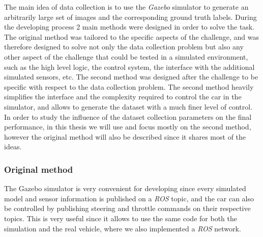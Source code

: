 \documentclass[a4paper,12pt,sort&compress]{article}
\begin{document}
The main idea of data collection is to use the \textit{Gazebo} simulator to generate an arbitrarily
large set of images and the corresponding ground truth labels. During the developing process 2 main
methods were designed in order to solve the task. The original method was tailored to the specific
aspects of the challenge, and was therefore designed to solve not only the data collection problem
but also any other aspect of the challenge that could be tested in a simulated environment, such as
the high level logic, the control system, the interface with the additional simulated sensors, etc.
The second method was designed after the challenge to be specific with respect to the data
collection problem. The second method heavily simplifies the interface and the complexity required
to control the car in the simulator, and allows to generate the dataset with a much finer level of
control. In order to study the influence of the dataset collection parameters on the final
performance, in this thesis we will use and focus mostly on the second method, however the original
method will also be described since it shares most of the ideas.

\subsubsection*{Original method}
The Gazebo simulator is very convenient for developing since every simulated model and sensor
information is published on a \textit{ROS} topic, and the car can also be controlled by publishing
steering and throttle commands on their respective topics. This is very useful since it allows to
use the same code for both the simulation and the real vehicle, where we also implemented a
\textit{ROS} network. 
\end{document}
